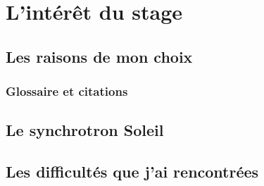 \chapter{L'intérêt du stage}
	
	\minitoc
	





\section{Les raisons de mon choix}
	\subsection{Glossaire et citations}

	

\section{Le synchrotron Soleil}
\blindtext
\section{Les difficultés que j'ai rencontrées}
\blindtext
\section{}


